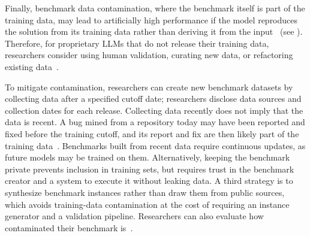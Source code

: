 Finally, benchmark data contamination, where the benchmark itself is part of the training data, may lead to artificially high performance if the model reproduces the solution from its training data rather than deriving it from the input~\cite{DBLP:journals/corr/abs-2406-04244} (see \limitationsmitigations). Therefore, for proprietary LLMs that do not release their training data, researchers \should consider using human validation, curating new data, or refactoring existing data~\cite{DBLP:journals/corr/abs-2406-04244}. 

To mitigate contamination, researchers can create new benchmark datasets by collecting data after a specified cutoff date; researchers \must disclose data sources and collection dates for each release. Collecting data recently does not imply that the data is recent. A bug mined from a repository today may have been reported and fixed before the training cutoff, and its report and fix are then likely part of the training data~\cite{Izadi2026benchmarking}. Benchmarks built from recent data require continuous updates, as future models may be trained on them. Alternatively, keeping the benchmark private prevents inclusion in training sets, but requires trust in the benchmark creator and a system to execute it without leaking data. A third strategy is to synthesize benchmark instances rather than draw them from public sources, which avoids training-data contamination at the cost of requiring an instance generator and a validation pipeline. Researchers can also evaluate how contaminated their benchmark is~\cite{DBLP:journals/corr/abs-2502-00678}.



